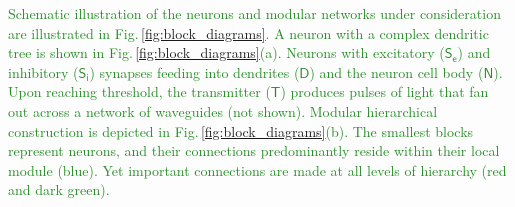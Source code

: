 \documentclass[twocolumn]{article}
\begin{document}
\textcolor{ForestGreen}{Schematic illustration of the neurons and modular networks under consideration are illustrated in Fig.\,\ref{fig:block_diagrams}. A neuron with a complex dendritic tree is shown in Fig.\,\ref{fig:block_diagrams}(a). Neurons with excitatory ($\mathsf{S_e}$) and inhibitory ($\mathsf{S_i}$) synapses feeding into dendrites ($\mathsf{D}$) and the neuron cell body ($\mathsf{N}$). Upon reaching threshold, the transmitter ($\mathsf{T}$) produces pulses of light that fan out across a network of waveguides (not shown). Modular hierarchical construction is depicted in Fig.\,\ref{fig:block_diagrams}(b). The smallest blocks represent neurons, and their connections predominantly reside within their local module (blue). Yet important connections are made at all levels of hierarchy (red and dark green).}
\begin{figure}[t!]
\end{figure}
\end{document}
